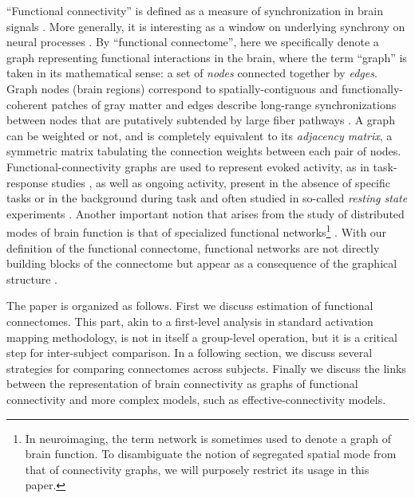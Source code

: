 \documentclass[5p]{elsarticle}
\begin{document}
``Functional connectivity'' is defined as a measure of synchronization in 
brain signals \cite{friston1994}. More generally, it is interesting as a 
window on underlying synchrony on neural processes \cite{lee2003}.
By ``functional connectome'', here we specifically denote a graph representing
functional interactions in the brain, where the term ``graph'' is taken in its
mathematical sense: a set of \emph{nodes} connected together by \emph{edges}.
Graph nodes (brain regions) correspond to spatially-contiguous and 
functionally-coherent patches of gray matter and edges describe long-range synchronizations between nodes
that are putatively subtended by large fiber pathways \cite{marrelec2006b}.  A
graph can be weighted or not, and is completely equivalent to its
\emph{adjacency matrix}, a symmetric matrix tabulating the connection weights
between each pair of nodes.  Functional-connectivity graphs are used to
represent evoked activity, as in task-response studies \cite{mcintosh2000}, as
well as ongoing activity, present in the absence of specific tasks or in the
background during task and often studied in so-called \emph{resting state}
experiments \cite{raichle2010}. Another important notion that arises from the
study of distributed modes of brain function is that of specialized functional
networks\footnote{In neuroimaging, the term network is sometimes used to denote
	a graph of brain function. To disambiguate the notion of segregated
	spatial mode \cite{fox2005} from that of connectivity graphs, we will
	purposely restrict its usage in this paper.} \cite{fox2005}. With our
definition of the functional connectome, functional networks are not directly
building blocks of the connectome but appear as a consequence of the graphical
structure \cite{varoquaux2010c,varoquaux2012}.

The paper is organized as follows. First we discuss estimation of functional
connectomes. This part, akin to a first-level analysis in standard activation
mapping methodology, is not in itself a group-level operation, but it is a
critical step for inter-subject comparison.  In a following section, we discuss
several strategies for comparing connectomes across subjects. Finally we discuss
the links between the representation of brain connectivity as graphs of
functional connectivity and more complex models, such as effective-connectivity
models.


\end{document}
